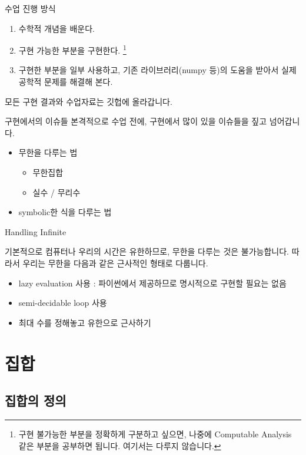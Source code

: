 \documentclass{beamer}
\begin{document}
\begin{frame}{수업 진행 방식}
\begin{enumerate} 
\item 수학적 개념을 배운다. 
\item 구현 가능한 부분을 구현한다. \footnote{구현 불가능한 부분을 정확하게 구분하고 싶으면, 나중에 Computable Analysis 같은 부분을 공부하면 됩니다. 여기서는 다루지 않습니다. }
\item 구현한 부분을 일부 사용하고, 기존 라이브러리(numpy 등)의 도움을 받아서 실제 공학적 문제를 해결해 본다. 
\end{enumerate}

모든 구현 결과와 수업자료는 깃헙에 올라갑니다. 
\end{frame}

\begin{frame}{구현에서의 이슈들}
본격적으로 수업 전에, 구현에서 많이 있을 이슈들을 짚고 넘어갑니다. 
\begin{itemize}
\item 무한을 다루는 법 
\begin{itemize} 
\item 무한집합 
\item 실수 / 무리수 
\end{itemize}
\item symbolic한 식을 다루는 법 
\end{itemize}
\end{frame}

\begin{frame}{Handling Infinite} 

기본적으로 컴퓨터나 우리의 시간은 유한하므로, 무한을 다루는 것은 불가능합니다. 따라서 우리는 무한을 다음과 같은 근사적인 형태로 다룹니다. 

\begin{itemize}
\item lazy evaluation 사용 : 파이썬에서 제공하므로 명시적으로 구현할 필요는 없음
\item semi-decidable loop 사용 
\item 최대 수를 정해놓고 유한으로 근사하기 
\end{itemize}

\end{frame}

\section{집합} 

\subsection{집합의 정의} 
\end{document}
